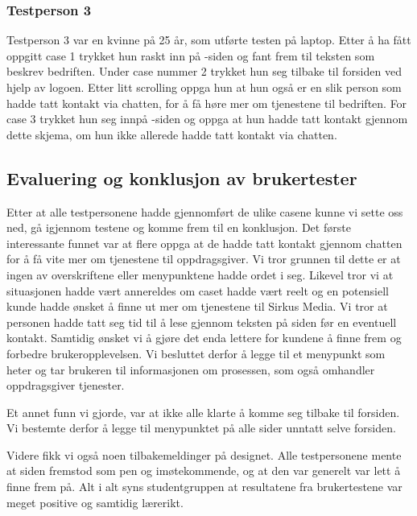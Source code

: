 \subsubsection{Testperson 3}
Testperson 3 var en kvinne på 25 år, som utførte testen på laptop. Etter å ha fått oppgitt case 1 trykket hun raskt inn på -siden og fant frem til teksten som beskrev bedriften. Under case nummer 2 trykket hun seg tilbake til forsiden ved hjelp av logoen. Etter litt scrolling oppga hun at hun også er en slik person som hadde tatt kontakt via chatten, for å få høre mer om tjenestene til bedriften. For case 3 trykket hun seg innpå -siden og oppga at hun hadde tatt kontakt gjennom dette skjema, om hun ikke allerede hadde tatt kontakt via chatten. 

\subsection{Evaluering og konklusjon av brukertester}
Etter at alle testpersonene hadde gjennomført de ulike casene kunne vi sette oss ned, gå igjennom testene og komme frem til en konklusjon. Det første interessante funnet var at flere oppga at de hadde tatt kontakt gjennom chatten for å få vite mer om tjenestene til oppdragsgiver. Vi tror grunnen til dette er at ingen av overskriftene eller menypunktene hadde ordet  i seg. Likevel tror vi at situasjonen hadde vært annereldes om caset hadde vært reelt og en potensiell kunde hadde ønsket å finne ut mer om tjenestene til Sirkus Media. Vi tror at personen hadde tatt seg tid til å lese gjennom teksten på siden før en eventuell kontakt. Samtidig ønsket vi å gjøre det enda lettere for kundene å finne frem og forbedre brukeropplevelsen. Vi besluttet derfor å legge til et menypunkt som heter  og tar brukeren til informasjonen om prosessen, som også omhandler oppdragsgiver tjenester.

Et annet funn vi gjorde, var at ikke alle klarte å komme seg tilbake til forsiden. Vi bestemte derfor å legge til menypunktet  på alle sider unntatt selve forsiden.

Videre fikk vi også noen tilbakemeldinger på designet. Alle testpersonene mente at siden fremstod som pen og imøtekommende, og at den var generelt var lett å finne frem på. Alt i alt syns studentgruppen at resultatene fra brukertestene var meget positive og samtidig lærerikt.


